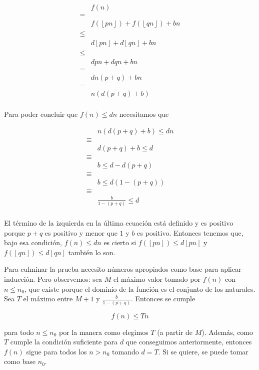 \documentclass{article}
\newcommand{\piso}[1]{\left \lfloor #1 \right \rfloor}
\begin{document}
\begin{align*}
 & f(n) \\
 = & \\
 & f(\piso{pn}) + f(\piso{qn}) + bn \\
 \leq & \\
 & d\piso{pn} + d\piso{qn} + bn \\
 \leq & \\
 & dpn + dqn + bn \\
 = & \\
 & dn(p+q) + bn \\
 = & \\
 & n(d(p+q) + b) \\
\end{align*}

Para poder concluir que $f(n) \leq dn$ necesitamos que

\begin{align*}
 & n(d(p+q) + b) \leq dn \\
 \equiv & \\
 & d(p+q) + b \leq d \\
 \equiv & \\
 & b \leq d - d(p+q) \\
 \equiv & \\
 & b \leq d(1 - (p+q)) \\
 \equiv & \\
 & \frac{b}{1-(p+q)} \leq d \\
\end{align*}

El término de la izquierda en la última ecuación está definido y es positivo
porque $p+q$ es positivo y menor que $1$ y $b$ es positivo. Entonces tenemos
que, bajo esa condición, $f(n) \leq dn$ es cierto si
$f(\piso{pn}) \leq d\piso{pn}$ y $f(\piso{qn}) \leq d\piso{qn}$ también lo son.

Para culminar la prueba necesito números apropiados como base para aplicar
inducción. Pero observemos: sea $M$ el máximo valor tomado por $f(n)$ con
$n \leq n_0$, que existe porque el dominio de la función es el conjunto de los
naturales. Sea $T$ el máximo entre $M+1$ y $\frac{b}{1-(p+q)}$. Entonces se cumple

$$
f(n) \leq Tn
$$

para todo $n \leq n_0$ por la manera como elegimos $T$ (a partir de $M$). Además,
como $T$ cumple la condición suficiente para $d$ que conseguimos anteriormente, entonces
$f(n)$ sigue para todos los $n > n_0$ tomando $d = T$. Si se quiere, se puede
tomar como base $n_0$.
\end{document}
